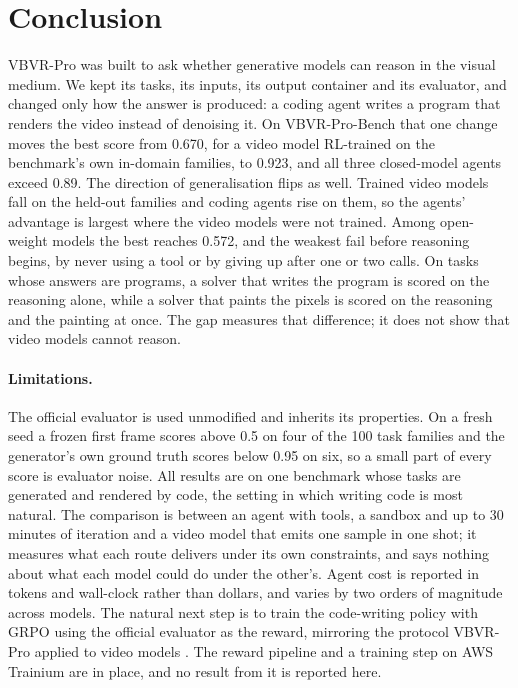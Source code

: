 \section{Conclusion}
\label{sec:conclusion}

VBVR-Pro was built to ask whether generative models can reason in the visual medium. We kept its tasks, its inputs, its output container and its evaluator, and changed only how the answer is produced: a coding agent writes a program that renders the video instead of denoising it. On VBVR-Pro-Bench that one change moves the best score from 0.670, for a video model RL-trained on the benchmark's own in-domain families, to 0.923, and all three closed-model agents exceed 0.89. The direction of generalisation flips as well. Trained video models fall on the held-out families and coding agents rise on them, so the agents' advantage is largest where the video models were not trained. Among open-weight models the best reaches 0.572, and the weakest fail before reasoning begins, by never using a tool or by giving up after one or two calls. On tasks whose answers are programs, a solver that writes the program is scored on the reasoning alone, while a solver that paints the pixels is scored on the reasoning and the painting at once. The gap measures that difference; it does not show that video models cannot reason.

\paragraph{Limitations.}
The official evaluator is used unmodified and inherits its properties. On a fresh seed a frozen first frame scores above 0.5 on four of the 100 task families and the generator's own ground truth scores below 0.95 on six, so a small part of every score is evaluator noise. All results are on one benchmark whose tasks are generated and rendered by code, the setting in which writing code is most natural. The comparison is between an agent with tools, a sandbox and up to 30 minutes of iteration and a video model that emits one sample in one shot; it measures what each route delivers under its own constraints, and says nothing about what each model could do under the other's. Agent cost is reported in tokens and wall-clock rather than dollars, and varies by two orders of magnitude across models. The natural next step is to train the code-writing policy with GRPO \citep{shao2024deepseekmath} using the official evaluator as the reward, mirroring the protocol VBVR-Pro applied to video models \citep{vbvrpro2026}. The reward pipeline and a training step on AWS Trainium are in place, and no result from it is reported here.
